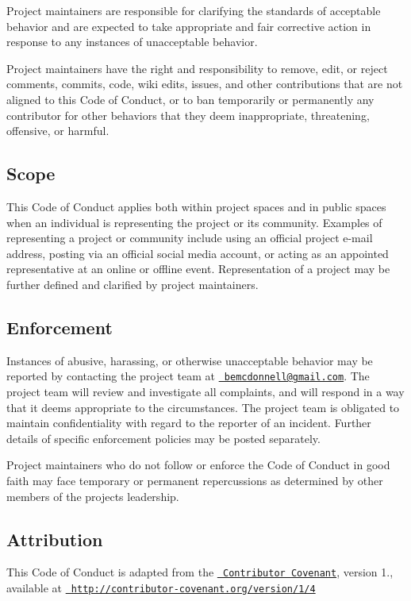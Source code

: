 Project maintainers are responsible for clarifying the standards of acceptable behavior and are expected to take appropriate and fair corrective action in response to any instances of unacceptable behavior.

Project maintainers have the right and responsibility to remove, edit, or reject comments, commits, code, wiki edits, issues, and other contributions that are not aligned to this Code of Conduct, or to ban temporarily or permanently any contributor for other behaviors that they deem inappropriate, threatening, offensive, or harmful.

\subsection*{Scope}

This Code of Conduct applies both within project spaces and in public spaces when an individual is representing the project or its community. Examples of representing a project or community include using an official project e-\/mail address, posting via an official social media account, or acting as an appointed representative at an online or offline event. Representation of a project may be further defined and clarified by project maintainers.

\subsection*{Enforcement}

Instances of abusive, harassing, or otherwise unacceptable behavior may be reported by contacting the project team at \href{mailto:bemcdonnell@gmail.com}{\texttt{ bemcdonnell@gmail.\+com}}. The project team will review and investigate all complaints, and will respond in a way that it deems appropriate to the circumstances. The project team is obligated to maintain confidentiality with regard to the reporter of an incident. Further details of specific enforcement policies may be posted separately.

Project maintainers who do not follow or enforce the Code of Conduct in good faith may face temporary or permanent repercussions as determined by other members of the project\textquotesingle{}s leadership.

\subsection*{Attribution}

This Code of Conduct is adapted from the \href{http://contributor-covenant.org}{\texttt{ Contributor Covenant}}, version 1., available at \href{http://contributor-covenant.org/version/1/4/}{\texttt{ http\+://contributor-\/covenant.\+org/version/1/4}} 